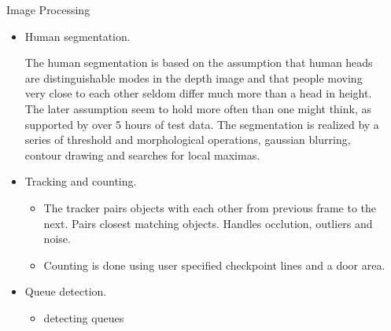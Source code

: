 \documentclass[final,hyperref={pdfpagelabels=false}]{beamer}
\begin{document}
\begin{frame}[t]
\begin{columns}[t]
\begin{column}{.03\textwidth}\end{column} %
 
\begin{column}{.465\textwidth} %



\begin{block}{Image Processing}

\begin{itemize}
\item Human segmentation.
\begin{itemize}
The human segmentation is based on the assumption that human heads are distinguishable modes in the depth image and that people moving very close to each other seldom differ much more than a head in height. The later assumption seem to hold more often than one might think, as supported by over 5 hours of test data. The segmentation is realized by a series of threshold and morphological operations, gaussian blurring, contour drawing and searches for local maximas. 
\end{itemize}
\item Tracking and counting.
\begin{itemize}
\item{The tracker pairs objects with each other from previous frame to the next. Pairs closest matching objects. Handles occlution, outliers and noise.}
\item{Counting is done using user specified checkpoint lines and a door area.}
\end{itemize}
\item Queue detection.
\begin{itemize}
\item{detecting queues}
\end{itemize}
\end{itemize}

\end{block}







\end{column}
\end{columns}
\end{frame}
\end{document}
